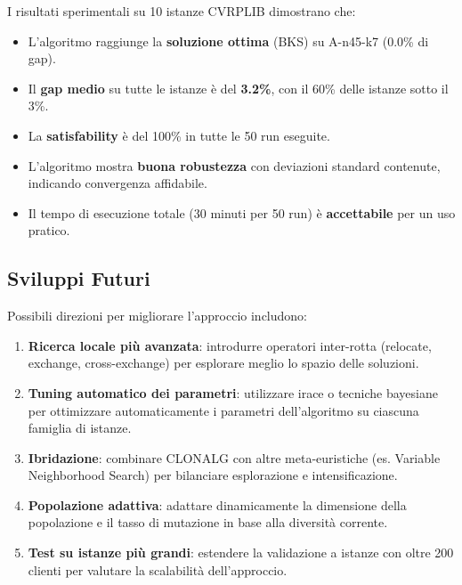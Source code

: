 \documentclass[a4paper,12pt]{article}
\begin{document}
I risultati sperimentali su 10 istanze CVRPLIB dimostrano che:
\begin{itemize}[leftmargin=*]
    \item L'algoritmo raggiunge la \textbf{soluzione ottima} (BKS) su A-n45-k7 (0.0\% di gap).
    \item Il \textbf{gap medio} su tutte le istanze è del \textbf{3.2\%}, con il 60\% delle istanze sotto il 3\%.
    \item La \textbf{satisfability} è del 100\% in tutte le 50 run eseguite.
    \item L'algoritmo mostra \textbf{buona robustezza} con deviazioni standard contenute, indicando convergenza affidabile.
    \item Il tempo di esecuzione totale (30 minuti per 50 run) è \textbf{accettabile} per un uso pratico.
\end{itemize}

\subsection{Sviluppi Futuri}

Possibili direzioni per migliorare l'approccio includono:

\begin{enumerate}[leftmargin=*]
    \item \textbf{Ricerca locale più avanzata}: introdurre operatori inter-rotta (relocate, exchange, cross-exchange) per esplorare meglio lo spazio delle soluzioni.
    \item \textbf{Tuning automatico dei parametri}: utilizzare irace o tecniche bayesiane per ottimizzare automaticamente i parametri dell'algoritmo su ciascuna famiglia di istanze.
    \item \textbf{Ibridazione}: combinare CLONALG con altre meta-euristiche (es. Variable Neighborhood Search) per bilanciare esplorazione e intensificazione.
    \item \textbf{Popolazione adattiva}: adattare dinamicamente la dimensione della popolazione e il tasso di mutazione in base alla diversità corrente.
    \item \textbf{Test su istanze più grandi}: estendere la validazione a istanze con oltre 200 clienti per valutare la scalabilità dell'approccio.
\end{enumerate}
\end{document}
